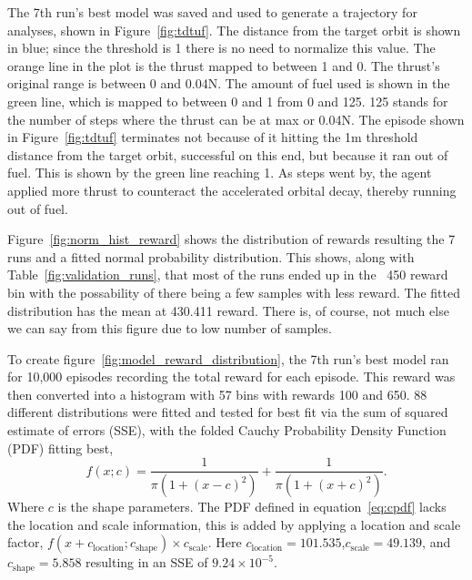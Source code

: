 The 7th run's best model was saved and used to generate a trajectory for analyses, shown in Figure~\ref{fig:tdtuf}. The distance from the target orbit is shown in blue; since the threshold is 1 there is no need to normalize this value. The orange line in the plot is the thrust mapped to between 1 and 0. The thrust's original range is between 0 and 0.04\si{N}. The amount of fuel used is shown in the green line, which is mapped to between 0 and 1 from 0 and 125. 125 stands for the number of steps where the thrust can be at max or 0.04\si{N}. The episode shown in Figure~\ref{fig:tdtuf} terminates not because of it hitting the 1\si{m} threshold distance from the target orbit, successful on this end, but because it ran out of fuel. This is shown by the green line reaching 1. As steps went by, the agent applied more thrust to counteract the accelerated orbital decay, thereby running out of fuel.

Figure~\ref{fig:norm_hist_reward} shows the distribution of rewards resulting the 7 runs and a fitted normal probability distribution. This shows, along with Table~\ref{fig:validation_runs}, that most of the runs ended up in the ~450 reward bin with the possability of there being a few samples with less reward. The fitted distribution has the mean at 430.411 reward. There is, of course, not much else we can say from this figure due to low number of samples. 

To create figure~\ref{fig:model_reward_distribution}, the 7th run's best model ran for 10,000 episodes recording the total reward for each episode. This reward was then converted into a histogram with 57 bins with rewards 100 and 650. 88 different distributions were fitted and tested for best fit via the sum of squared estimate of errors (SSE), with the folded Cauchy Probability Density Function (PDF) fitting best, 
\begin{equation}\label{eq:cpdf}
	f(x;c)=\frac{1}{\pi(1+(x-c)^2)}+\frac{1}{\pi(1+(x+c)^2)}.
\end{equation} 
Where $c$ is the shape parameters. The PDF defined in equation~\ref{eq:cpdf} lacks the location and scale information, this is added by applying a location and scale factor, $f(x+c_{\text{location}};c_{\text{shape}})\times c_{\text{scale}}$. Here $c_{\text{location}}=101.535$,$c_{\text{scale}}=49.139$, and $c_{\text{shape}}=5.858$ resulting in an SSE of $9.24\times 10^{-5}$.


